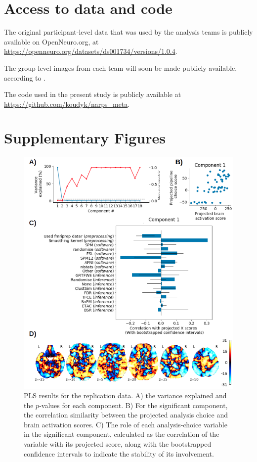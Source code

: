 \documentclass[a4paper,doc,natbib]{apa6}
\begin{document}
\section{Access to data and code}
The original participant-level data that was used by the analysis teams is publicly available on OpenNeuro.org, at \url{https://openneuro.org/datasets/ds001734/versions/1.0.4}.

The group-level images from each team will soon be made publicly available, according to \cite{botvinik-nezer_fmri_2019}.

The code used in the present study is publicly available at \url{https://github.com/koudyk/narps_meta}.

\raggedbottom

\pagebreak

\section{Supplementary Figures} \label{sec:supp_figs}
\begin{figure}[!htb]
	\includegraphics[width=\textwidth]{figures/results1_PLS_all_hypo2.png}
	\caption{\label{fig:pls_results2}PLS results for the replication data. A) the variance explained and the $p$-values for each component. B) For the significant component, the correlation similarity between the projected analysis choice and brain activation scores. C) The role of each analysis-choice variable in the significant component, calculated as the correlation of the variable with its projected score, along with the bootstrapped confidence intervals to indicate the stability of its involvement.}

\end{figure}
\end{document}
